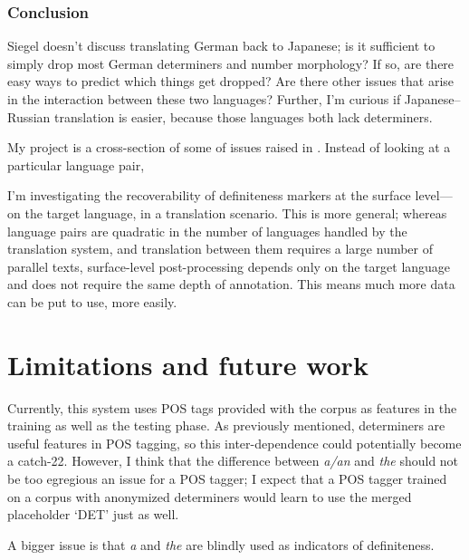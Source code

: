 \documentclass[11pt]{article}
\begin{document}
\subsubsection*{Conclusion}

Siegel doesn't discuss translating German back to Japanese; is it sufficient to simply drop most German determiners and number morphology? If so, are there easy ways to predict which things get dropped? Are there other issues that arise in the interaction between these two languages? Further, I'm curious if Japanese--Russian translation is easier, because those languages both lack determiners.

My project is a cross-section of some of issues raised in \citet{siegel:1996}. Instead of looking at a particular language pair,

I'm investigating the recoverability of definiteness markers at the surface level---on the target language, in a translation scenario. This is more general; whereas language pairs are quadratic in the number of languages handled by the translation system, and translation between them requires a large number of parallel texts, surface-level post-processing depends only on the target language and does not require the same depth of annotation. This means much more data can be put to use, more easily.







\section{Limitations and future work}

Currently, this system uses POS tags provided with the corpus as features in the training as well as the testing phase. As previously mentioned, determiners are useful features in POS tagging, so this inter-dependence could potentially become a catch-22. However, I think that the difference between \emph{a/an} and \emph{the} should not be too egregious an issue for a POS tagger; I expect that a POS tagger trained on a corpus with anonymized determiners would learn to use the merged placeholder `DET' just as well.

A bigger issue is that \emph{a} and \emph{the} are blindly used as indicators of definiteness.



\end{document}
